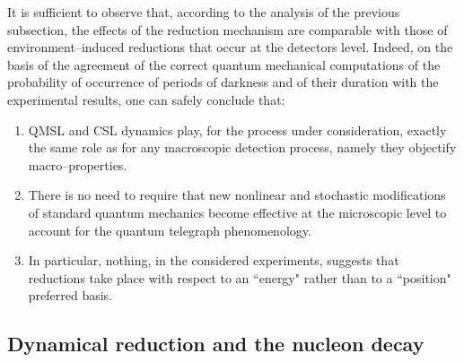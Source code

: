 \documentclass[10pt,a4paper]{article}
\begin{document}
It is sufficient to observe that, according to the analysis of the
previous subsection, the effects of the reduction mechanism are
comparable with those of environment--induced reductions that
occur at the detectors level.
Indeed, on the basis of the agreement of the correct quantum
mechanical computations of the probability of occurrence of
periods of darkness and of their duration with the experimental
results, one can safely conclude that:
\begin{enumerate}
\item QMSL and CSL dynamics play, for the process under
consideration, exactly the same role as for any macroscopic
detection process, namely they objectify macro--properties.
\item There is no need to require that new nonlinear and stochastic
modifications of standard quantum mechanics become effective at
the microscopic level to account for the quantum telegraph
phenomenology.
\item In particular, nothing, in the considered experiments, suggests
that reductions take place with respect to an ``energy" rather
than to a ``position" preferred basis.
\end{enumerate}


\subsection{Dynamical reduction and the nucleon decay} \label{sec153}
\end{document}
